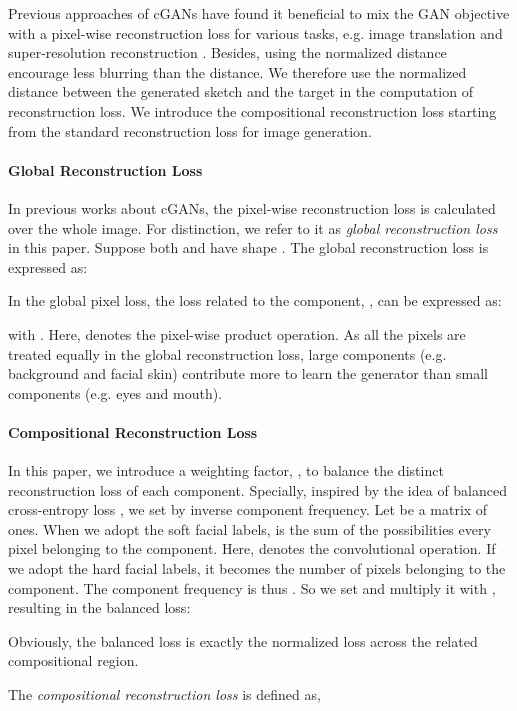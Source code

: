 \documentclass[journal]{IEEEtran}
\begin{document}
Previous approaches of cGANs have found it beneficial to mix the GAN objective with a pixel-wise reconstruction loss for various tasks, e.g. image translation \cite{Isola2017Pix2Pix} and super-resolution reconstruction \cite{Johnson2016Perceptual}. Besides, using the normalized  distance encourage less blurring than the  distance. We therefore use the normalized  distance between the generated sketch  and the target  in the computation of reconstruction loss. We introduce the compositional reconstruction loss starting from the standard reconstruction loss for image generation. 

\paragraph{Global Reconstruction Loss}
In previous works about cGANs, the pixel-wise reconstruction loss is calculated over the whole image. For distinction, we refer to it as \textit{global reconstruction loss} in this paper. Suppose both  and  have shape . The global reconstruction loss is expressed as:


In the global pixel loss, the  loss related to the  component, , can be expressed as:

with . Here,  denotes the pixel-wise product operation. 
As all the pixels are treated equally in the global reconstruction loss, large components (e.g. background and facial skin) contribute more to learn the generator than small components (e.g. eyes and mouth).

\paragraph{Compositional Reconstruction Loss}
In this paper, we introduce a weighting factor, , to balance the distinct reconstruction loss of each component. Specially, inspired by the idea of balanced cross-entropy loss \cite{Lin2017Focal}, we set  by inverse component frequency. Let  be a  matrix of ones. When we adopt the soft facial labels,  is the sum of the possibilities every pixel belonging to the  component. Here,  denotes the convolutional operation. If we adopt the hard facial labels, it becomes the number of pixels belonging to the  component. The component frequency is thus . So we set  and multiply it with , resulting in the balanced  loss:

Obviously, the balanced  loss is exactly the normalized  loss across the related compositional region.

The \textit{compositional reconstruction loss} is defined as,
\end{document}
